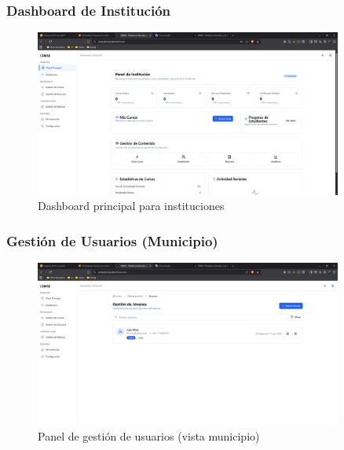 \documentclass[12pt,a4paper]{article}
\begin{document}
\begin{enumerate}
\subsubsection{Dashboard de Institución}
\begin{figure}[H]
    \centering
    \includegraphics[width=0.9\textwidth]{screenshots/institutions/dashboard.png}
    \caption{Dashboard principal para instituciones}
    \label{fig:institution-dashboard}
\end{figure}

\subsubsection{Gestión de Usuarios (Municipio)}
\begin{figure}[H]
    \centering
    \includegraphics[width=0.9\textwidth]{screenshots/institutions/user-management.png}
    \caption{Panel de gestión de usuarios (vista municipio)}
    \label{fig:institution-users}
\end{figure}


\end{enumerate}
\end{document}
